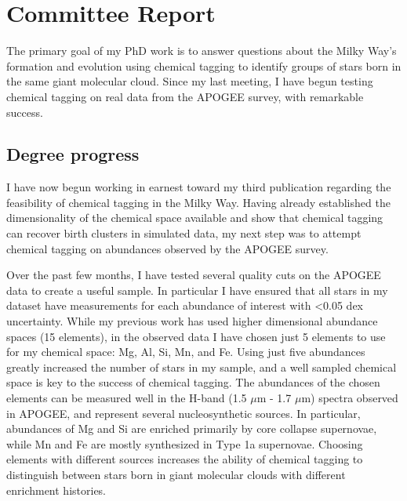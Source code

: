 \documentclass[11pt]{article}
\begin{document}
    
    \section*{Committee Report}
    
    The primary goal of my PhD work is to answer questions about the Milky Way's formation and evolution using chemical tagging to identify groups of stars born in the same giant molecular cloud. Since my last meeting, I have begun testing chemical tagging on real data from the APOGEE survey, with remarkable success. 

    \subsection*{Degree progress}

	I have now begun working in earnest toward my third publication regarding the feasibility of chemical tagging in the Milky Way. Having already established the dimensionality of the chemical space available and show that chemical tagging can recover birth clusters in simulated data, my next step was to attempt chemical tagging on abundances observed by the APOGEE \citep{Majewski2017} survey.
	
	Over the past few months, I have tested several quality cuts on the APOGEE data to create a useful sample. In particular I have ensured that all stars in my dataset have measurements for each abundance of interest with <0.05 dex uncertainty. While my previous work has used higher dimensional abundance spaces (15 elements), in the observed data I have chosen just 5 elements to use for my chemical space: Mg, Al, Si, Mn, and Fe. Using just five abundances greatly increased the number of stars in my sample, and a well sampled chemical space is key to the success of chemical tagging. The abundances of the chosen elements can be measured well in the H-band (1.5 $\mu$m - 1.7 $\mu$m) spectra observed in APOGEE, and represent several nucleosynthetic sources. In particular, abundances of Mg and Si are enriched primarily by core collapse supernovae, while Mn and Fe are mostly synthesized in Type 1a supernovae. Choosing elements with different sources increases the ability of chemical tagging to distinguish between stars born in giant molecular clouds with different enrichment histories.
	
\end{document}
